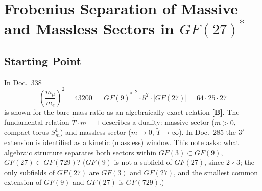
\providecommand{\BM}{\textbf{[B]}}
\providecommand{\KM}{\textbf{[K]}}
\providecommand{\SM}{\textbf{[S]}}
\providecommand{\LM}{\textbf{[L]}}
\providecommand{\SetzM}{\textbf{[SETZUNG]}}

\chapter*{Frobenius Separation of Massive and Massless Sectors in $GF(27)^*$}

\begin{abstract}
The multiplicative group $GF(27)^*\cong\mathbb{Z}_{26}$ decomposes under the
Frobenius automorphism $\phi:x\mapsto x^3$ into exactly two types: two fixed
points $\{+1,-1\}$ and eight three-element orbits. Via the decomposition
$\mathbb{Z}_{26}\cong\mathbb{Z}_2\times\mathbb{Z}_{13}$ (CRT), four
$\mathbb{Z}_{13}$ three-orbits times two $\mathbb{Z}_2$ parities yield the
eight gluons of the adjoint $SU(3)$ representation. The orbit decomposition
itself is algebraically forced. For the fixed points $\{+1,-1\}$ there are two
readings: as the massive $\mathbb{Z}_2$ sector (particle/antiparticle) and, as
$GF(3)^*$ of the fixed field $GF(3)$, as the $U(1)$ sector (photon). Since it is
the same set, this double assignment is not resolved; the assignment is open
\SM. Whether the massless modes carry spin~1 does not follow from the
Frobenius structure (Doc.~231, open). Status: \KM.
\end{abstract}

\section{Starting Point}

In Doc.~338
\[
\left(\frac{m_\mu}{m_e}\right)^2=43200
=|GF(9)^*|^2\cdot5^2\cdot|GF(27)|=64\cdot25\cdot27
\]
is shown for the bare mass ratio as an algebraically exact relation \BM. The fundamental relation
$\tilde{T}\cdot m=1$ describes a duality: massive sector ($m>0$, compact torus
$S^1_m$) and massless sector ($m\to0$, $\tilde{T}\to\infty$). In Doc.~285 the
$3'$ extension is identified as a kinetic (massless) window. This note asks:
what algebraic structure separates both sectors within
$GF(3)\subset GF(9)$, $GF(27)\subset GF(729)$?
($GF(9)$ is not a subfield of $GF(27)$, since $2\nmid3$; the only subfields of
$GF(27)$ are $GF(3)$ and $GF(27)$, and the smallest common extension of $GF(9)$
and $GF(27)$ is $GF(729)$.)


